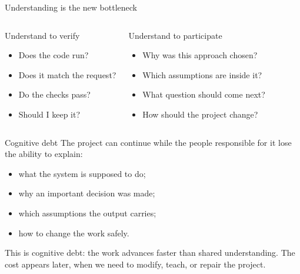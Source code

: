\begin{frame}{Understanding is the new bottleneck}
  \begin{columns}[T,onlytextwidth]
      \begin{block}{Understand to verify}
        \begin{itemize}
          \item Does the code run?
          \item Does it match the request?
          \item Do the checks pass?
          \item Should I keep it?
        \end{itemize}
      \end{block}
      \begin{block}{Understand to participate}
        \begin{itemize}
          \item Why was this approach chosen?
          \item Which assumptions are inside it?
          \item What question should come next?
          \item How should the project change?
        \end{itemize}
      \end{block}
  \end{columns}

  \vfill
\end{frame}

\begin{frame}{Cognitive debt}
  The project can continue while the people responsible for it lose the ability
  to explain:
  \begin{itemize}
    \item what the system is supposed to do;
    \item why an important decision was made;
    \item which assumptions the output carries;
    \item how to change the work safely.
  \end{itemize}

  \vspace{0.45em}
  This is \alert{cognitive debt}: the work advances faster than shared
  understanding. The cost appears later, when we need to modify, teach, or
  repair the project.

  \vfill
\end{frame}


